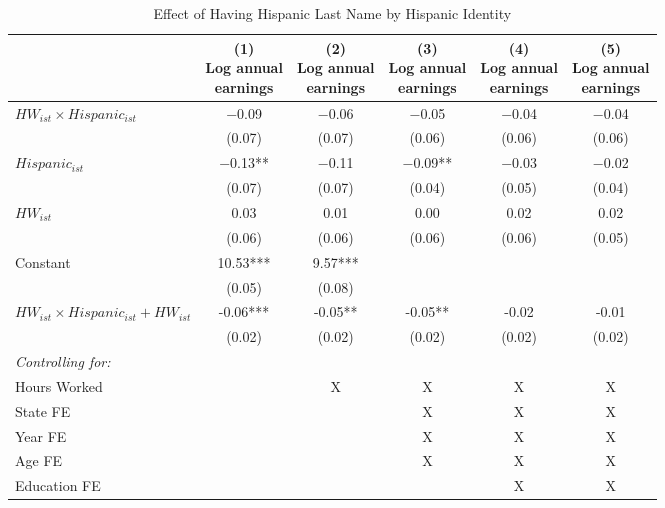 \begin{table}[H]
\tablefont
\caption{Effect of Having Hispanic Last Name by Hispanic Identity\label{tab:identreg}}
\begin{threeparttable}
\begin{tabular}[t]{lccccc}
\toprule
  & \specialcell{(1) \\ Log annual \\ earnings} & \specialcell{(2) \\ Log annual \\ earnings} & \specialcell{(3) \\ Log annual \\ earnings} & \specialcell{(4) \\  Log annual \\ earnings} & \specialcell{(5) \\  Log annual \\ earnings}\\
\midrule
$HW_{ist} \times Hispanic_{ist}$ & \num{-0.09} & \num{-0.06} & \num{-0.05} & \num{-0.04} & \num{-0.04}\\
 & (\num{0.07}) & (\num{0.07}) & (\num{0.06}) & (\num{0.06}) & (\num{0.06})\\
$Hispanic_{ist}$ & \num{-0.13}** & \num{-0.11} & \num{-0.09}** & \num{-0.03} & \num{-0.02}\\
 & (\num{0.07}) & (\num{0.07}) & (\num{0.04}) & (\num{0.05}) & (\num{0.04})\\
$HW_{ist}$ & \num{0.03} & \num{0.01} & \num{0.00} & \num{0.02} & \num{0.02}\\
 & (\num{0.06}) & (\num{0.06}) & (\num{0.06}) & (\num{0.06}) & (\num{0.05})\\
Constant & \num{10.53}*** & \num{9.57}*** &  &  & \\
 & (\num{0.05}) & (\num{0.08}) &  &  & \\
\midrule
$HW_{ist} \times Hispanic_{ist} + HW_{ist}$ & -0.06*** & -0.05** & -0.05** & -0.02 & -0.01\\
 & (0.02) & (0.02) & (0.02) & (0.02) & (0.02)\\
\midrule
\textit{Controlling for:} &  &  &  &  & \\
Hours Worked &  & X & X & X & X\\
State FE &  &  & X & X & X\\
Year FE &  &  & X & X & X\\
Age FE &  &  & X & X & X\\
Education FE &  &  &  & X & X\\

\end{tabular}
\end{threeparttable}
\end{table}
